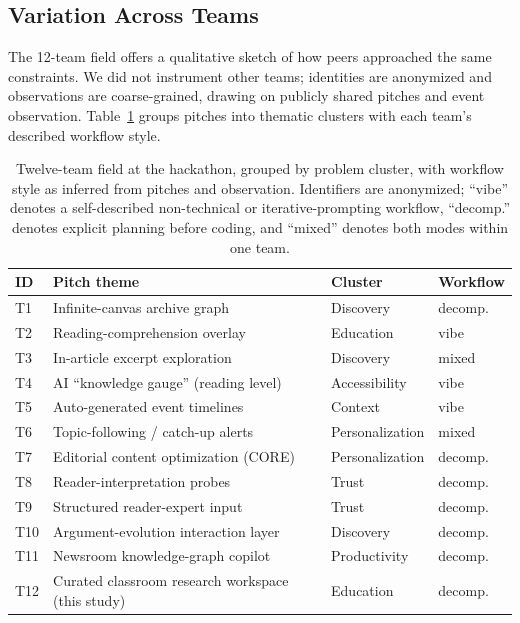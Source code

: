 \subsection{Variation Across Teams}
\label{sec:teamvariation}

The 12-team field offers a qualitative sketch of how peers approached
the same constraints. We did not instrument other teams; identities are
anonymized and observations are coarse-grained, drawing on publicly
shared pitches and event observation. Table~\ref{tab:teams} groups
pitches into thematic clusters with each team's described workflow style.

\begin{table}[t]
  \centering
  \caption{Twelve-team field at the hackathon, grouped by problem
    cluster, with workflow style as inferred from pitches and
    observation. Identifiers are anonymized; ``vibe'' denotes a
    self-described non-technical or iterative-prompting workflow,
    ``decomp.'' denotes explicit planning before coding, and ``mixed''
    denotes both modes within one team.}
  \label{tab:teams}
  \scriptsize
  \begin{tabular}{@{}p{}p{}p{}p{}@{}}
    \toprule
    \textbf{ID} & \textbf{Pitch theme} & \textbf{Cluster} & \textbf{Workflow} \\
    \midrule
    T1  & Infinite-canvas archive graph        & Discovery       & decomp.\ \\
    T2  & Reading-comprehension overlay        & Education       & vibe \\
    T3  & In-article excerpt exploration       & Discovery       & mixed \\
    T4  & AI ``knowledge gauge'' (reading level) & Accessibility & vibe \\
    T5  & Auto-generated event timelines       & Context         & vibe \\
    T6  & Topic-following / catch-up alerts    & Personalization & mixed \\
    T7  & Editorial content optimization (CORE) & Personalization & decomp.\ \\
    T8  & Reader-interpretation probes         & Trust           & decomp.\ \\
    T9  & Structured reader-expert input       & Trust           & decomp.\ \\
    T10 & Argument-evolution interaction layer & Discovery       & decomp.\ \\
    T11 & Newsroom knowledge-graph copilot     & Productivity    & decomp.\ \\
    T12 & Curated classroom research workspace (this study) & Education & decomp.\ \\
    \bottomrule
  \end{tabular}
\end{table}


